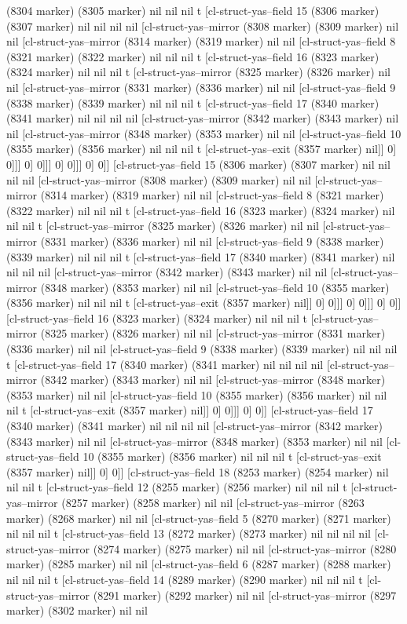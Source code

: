 {{(8304 marker) (8305 marker) nil nil nil t [cl-struct-yas--field 15 (8306 marker) (8307 marker) nil nil nil nil [cl-struct-yas--mirror (8308 marker) (8309 marker) nil nil [cl-struct-yas--mirror (8314 marker) (8319 marker) nil nil [cl-struct-yas--field 8 (8321 marker) (8322 marker) nil nil nil t [cl-struct-yas--field 16 (8323 marker) (8324 marker) nil nil nil t [cl-struct-yas--mirror (8325 marker) (8326 marker) nil nil [cl-struct-yas--mirror (8331 marker) (8336 marker) nil nil [cl-struct-yas--field 9 (8338 marker) (8339 marker) nil nil nil t [cl-struct-yas--field 17 (8340 marker) (8341 marker) nil nil nil nil [cl-struct-yas--mirror (8342 marker) (8343 marker) nil nil [cl-struct-yas--mirror (8348 marker) (8353 marker) nil nil [cl-struct-yas--field 10 (8355 marker) (8356 marker) nil nil nil t [cl-struct-yas--exit (8357 marker) nil]] 0] 0]]] 0] 0]]] 0] 0]]] 0] 0]] [cl-struct-yas--field 15 (8306 marker) (8307 marker) nil nil nil nil [cl-struct-yas--mirror (8308 marker) (8309 marker) nil nil [cl-struct-yas--mirror (8314 marker) (8319 marker) nil nil [cl-struct-yas--field 8 (8321 marker) (8322 marker) nil nil nil t [cl-struct-yas--field 16 (8323 marker) (8324 marker) nil nil nil t [cl-struct-yas--mirror (8325 marker) (8326 marker) nil nil [cl-struct-yas--mirror (8331 marker) (8336 marker) nil nil [cl-struct-yas--field 9 (8338 marker) (8339 marker) nil nil nil t [cl-struct-yas--field 17 (8340 marker) (8341 marker) nil nil nil nil [cl-struct-yas--mirror (8342 marker) (8343 marker) nil nil [cl-struct-yas--mirror (8348 marker) (8353 marker) nil nil [cl-struct-yas--field 10 (8355 marker) (8356 marker) nil nil nil t [cl-struct-yas--exit (8357 marker) nil]] 0] 0]]] 0] 0]]] 0] 0]] [cl-struct-yas--field 16 (8323 marker) (8324 marker) nil nil nil t [cl-struct-yas--mirror (8325 marker) (8326 marker) nil nil [cl-struct-yas--mirror (8331 marker) (8336 marker) nil nil [cl-struct-yas--field 9 (8338 marker) (8339 marker) nil nil nil t [cl-struct-yas--field 17 (8340 marker) (8341 marker) nil nil nil nil [cl-struct-yas--mirror (8342 marker) (8343 marker) nil nil [cl-struct-yas--mirror (8348 marker) (8353 marker) nil nil [cl-struct-yas--field 10 (8355 marker) (8356 marker) nil nil nil t [cl-struct-yas--exit (8357 marker) nil]] 0] 0]]] 0] 0]] [cl-struct-yas--field 17 (8340 marker) (8341 marker) nil nil nil nil [cl-struct-yas--mirror (8342 marker) (8343 marker) nil nil [cl-struct-yas--mirror (8348 marker) (8353 marker) nil nil [cl-struct-yas--field 10 (8355 marker) (8356 marker) nil nil nil t [cl-struct-yas--exit (8357 marker) nil]] 0] 0]] [cl-struct-yas--field 18 (8253 marker) (8254 marker) nil nil nil t [cl-struct-yas--field 12 (8255 marker) (8256 marker) nil nil nil t [cl-struct-yas--mirror (8257 marker) (8258 marker) nil nil [cl-struct-yas--mirror (8263 marker) (8268 marker) nil nil [cl-struct-yas--field 5 (8270 marker) (8271 marker) nil nil nil t [cl-struct-yas--field 13 (8272 marker) (8273 marker) nil nil nil nil [cl-struct-yas--mirror (8274 marker) (8275 marker) nil nil [cl-struct-yas--mirror (8280 marker) (8285 marker) nil nil [cl-struct-yas--field 6 (8287 marker) (8288 marker) nil nil nil t [cl-struct-yas--field 14 (8289 marker) (8290 marker) nil nil nil t [cl-struct-yas--mirror (8291 marker) (8292 marker) nil nil [cl-struct-yas--mirror (8297 marker) (8302 marker) nil nil }}
